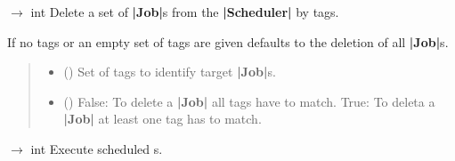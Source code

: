 \documentclass[letterpaper,10pt,english]{sphinxmanual}
\begin{document}
\begin{fulllineitems}
\begin{fulllineitems}
\label{\detokenize{index:scheduler.Scheduler.delete_jobs}}
\pysigstartsignatures
\pysiglinewithargsret
{}
{\sphinxparamcomma {}}
{{ $\rightarrow$ int}}
\pysigstopsignatures
\sphinxAtStartPar
Delete a set of {\color{red}\bfseries{}|Job|}s from the {\color{red}\bfseries{}|Scheduler|} by tags.

\sphinxAtStartPar
If no tags or an empty set of tags are given defaults to the deletion
of all {\color{red}\bfseries{}|Job|}s.
\begin{quote}\begin{description}
\begin{itemize}
\item {} 
\sphinxAtStartPar
{} (\sphinxstyleliteralemphasis{\sphinxupquote{{[}}}\sphinxstyleliteralemphasis{\sphinxupquote{{[}}}\sphinxstyleliteralemphasis{\sphinxupquote{{]}}}\sphinxstyleliteralemphasis{\sphinxupquote{{]}}}) \textendash{} Set of tags to identify target {\color{red}\bfseries{}|Job|}s.

\item {} 
\sphinxAtStartPar
{} () \textendash{} False: To delete a {\color{red}\bfseries{}|Job|} all tags have to match.
True: To deleta a {\color{red}\bfseries{}|Job|} at least one tag has to match.

\end{itemize}

\end{description}\end{quote}

\end{fulllineitems}


\begin{fulllineitems}
\label{\detokenize{index:scheduler.Scheduler.exec_jobs}}
\pysigstartsignatures
\pysiglinewithargsret
{}
{}
{{ $\rightarrow$ int}}
\pysigstopsignatures
\sphinxAtStartPar
Execute scheduled s.


\end{fulllineitems}
\end{fulllineitems}
\end{document}
